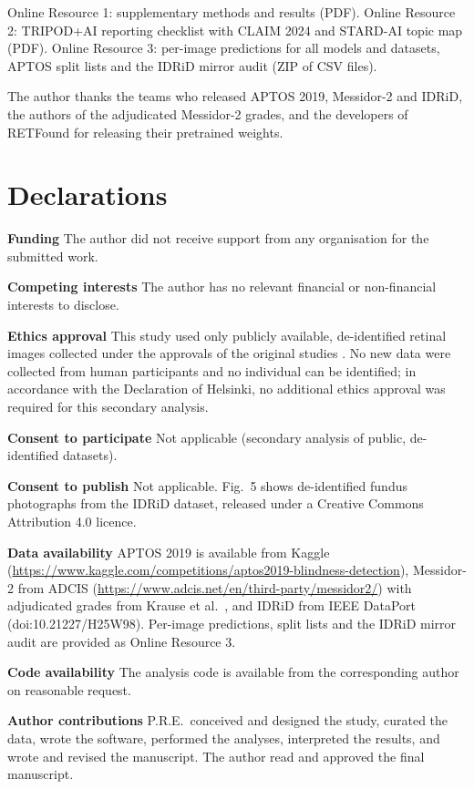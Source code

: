 \documentclass[pdflatex,sn-basic,Numbered]{sn-jnl}
\begin{document}
\backmatter

Online Resource 1: supplementary methods and results (PDF). Online Resource 2: TRIPOD+AI reporting checklist with CLAIM 2024 and STARD-AI topic map (PDF). Online Resource 3: per-image predictions for all models and datasets, APTOS split lists and the IDRiD mirror audit (ZIP of CSV files).

The author thanks the teams who released APTOS 2019, Messidor-2 and IDRiD, the authors of the adjudicated Messidor-2 grades, and the developers of RETFound for releasing their pretrained weights.

\section*{Declarations}

\textbf{Funding} The author did not receive support from any organisation for the submitted work.

\textbf{Competing interests} The author has no relevant financial or non-financial interests to disclose.

\textbf{Ethics approval} This study used only publicly available, de-identified retinal images collected under the approvals of the original studies \cite{aptos2019,decenciere2014,krause2018,porwal2018}. No new data were collected from human participants and no individual can be identified; in accordance with the Declaration of Helsinki, no additional ethics approval was required for this secondary analysis.

\textbf{Consent to participate} Not applicable (secondary analysis of public, de-identified datasets).

\textbf{Consent to publish} Not applicable. Fig.~5 shows de-identified fundus photographs from the IDRiD dataset, released under a Creative Commons Attribution 4.0 licence.

\textbf{Data availability} APTOS 2019 is available from Kaggle (\url{https://www.kaggle.com/competitions/aptos2019-blindness-detection}), Messidor-2 from ADCIS (\url{https://www.adcis.net/en/third-party/messidor2/}) with adjudicated grades from Krause et al.\ \cite{krause2018}, and IDRiD from IEEE DataPort (doi:10.21227/H25W98). Per-image predictions, split lists and the IDRiD mirror audit are provided as Online Resource 3.

\textbf{Code availability} The analysis code is available from the corresponding author on reasonable request.

\textbf{Author contributions} P.R.E.\ conceived and designed the study, curated the data, wrote the software, performed the analyses, interpreted the results, and wrote and revised the manuscript. The author read and approved the final manuscript.


\end{document}

